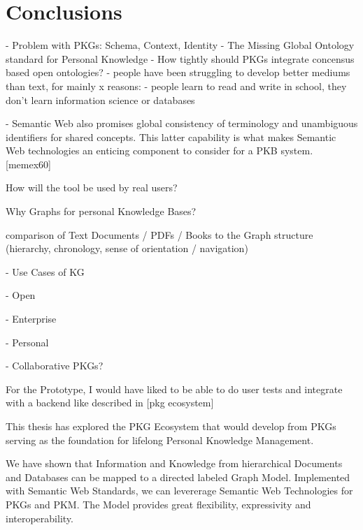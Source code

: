 \chapter{Conclusions} \label{ch:conclusions}


- Problem with PKGs: Schema, Context, Identity
- The Missing Global Ontology standard for Personal Knowledge
    - How tightly should PKGs integrate concensus based open ontologies?
- people have been struggling to develop better mediums than text, for mainly x reasons:
    - people learn to read and write in school, they don’t learn information science or databases

- Semantic Web also promises global consistency of terminology and unambiguous identifiers for shared concepts. This latter capability is what makes Semantic Web technologies an enticing component to consider for a PKB system. [memex60]

How will the tool be used by real users?

Why Graphs for personal Knowledge Bases?

comparison of Text Documents / PDFs / Books to the Graph structure (hierarchy, chronology, sense of orientation / navigation)

- Use Cases of KG
    
    - Open
    
    - Enterprise
    
    - Personal
    
    - Collaborative PKGs?


For the Prototype, I would have liked to be able to do user tests and integrate with a backend like described in [pkg ecosystem]


This thesis has explored the PKG Ecosystem that would develop from PKGs serving as the foundation for lifelong Personal Knowledge Management.

We have shown that Information and Knowledge from hierarchical Documents and Databases can be mapped to a directed labeled Graph Model. Implemented with Semantic Web Standards, we can levererage Semantic Web Technologies for PKGs and PKM. The Model provides great flexibility, expressivity and interoperability.

